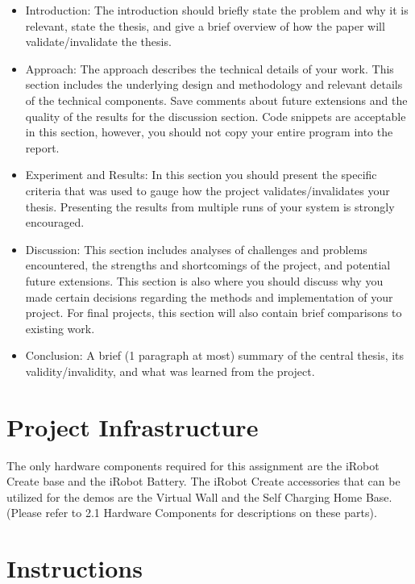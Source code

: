 \begin{itemize} 
\item Introduction:  The introduction should briefly state the problem and why it is relevant, state the thesis, and give a brief overview of how the paper will validate/invalidate the thesis.

\item Approach:  The approach describes the technical details of your work.  This section includes the underlying design and methodology and relevant details of the technical components.  Save comments about future extensions and the quality of the results for the discussion section.  Code snippets are acceptable in this section, however, you should not copy your entire program into the report.  

\item Experiment and Results:  In this section you should present the specific criteria that was used to gauge how the project validates/invalidates your thesis.  Presenting the results from multiple runs of your system is strongly encouraged.  

\item Discussion:  This section includes analyses of challenges and problems encountered, the strengths and shortcomings of the project, and potential future extensions.  This section is also where you should discuss why you made certain decisions regarding the methods and implementation of your project.  For final projects, this section will also contain brief comparisons to existing work.  

\item Conclusion:  A brief (1 paragraph at most) summary of the central thesis, its validity/invalidity, and what was learned from the project.  

\end{itemize} 


\section{Project Infrastructure}

The only hardware components required for this assignment are the iRobot Create base and the iRobot Battery. The iRobot Create accessories that can be utilized for the demos are the Virtual Wall and the Self Charging Home Base. (Please refer to 2.1 Hardware Components for descriptions on these parts).

\section{Instructions}

